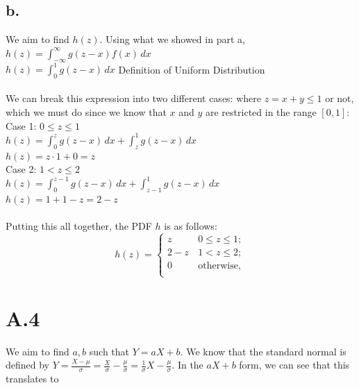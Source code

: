 \documentclass{article}
\newcommand{\1}{\mathbf{1}}
\begin{document}
{\subsection*{b.}
We aim to find $h(z)$. Using what we showed in part a, \\
$h(z) = \int_{-\infty}^{\infty} g(z - x) f(x) \,dx$ \\ 
$h(z) = \int_{0}^{1} g(z-x) \,dx$ \hfill Definition of Uniform Distribution \\ \\
We can break this expression into two different cases: where $z = x + y \leq 1$ or not, which we must do since we know that $x$ and $y$ are restricted in the range $[0, 1]$: \\
Case 1: $0 \leq z \leq 1$ \\ 
$h(z) = \int_{0}^{z} g(z-x) \,dx + \int_{z}^{1} g(z-x) \,dx$ \\ 
$h(z) = z \cdot 1 + 0 = z$ \\
Case 2: $1 < z \leq 2$ \\ 
$h(z) = \int_{0}^{z-1} g(z-x) \,dx + \int_{z-1}^{1} g(z-x) \,dx$ \\ 
$h(z) = 1 + 1 - z = 2-z$ \\ \\
Putting this all together, the PDF $h$ is as follows:
\[
h\left(z\right)=\begin{cases}
z & \,0\le z\le1;\\
2 - z & \,1< z\le2;\\
0 & \,\mbox{otherwise,}\\
\end{cases}
\]

}

\section*{A.4}
{\Large 

We aim to find $a, b$ such that $Y = aX + b$. We know that the standard normal is defined by $Y = \frac{X - \mu}{\sigma} = \frac{X}{\sigma} - \frac{\mu}{\sigma} = \frac{1}{\sigma}X - \frac{\mu}{\sigma}$. In the $aX + b$ form, we can see that this translates to 

}
\end{document}

